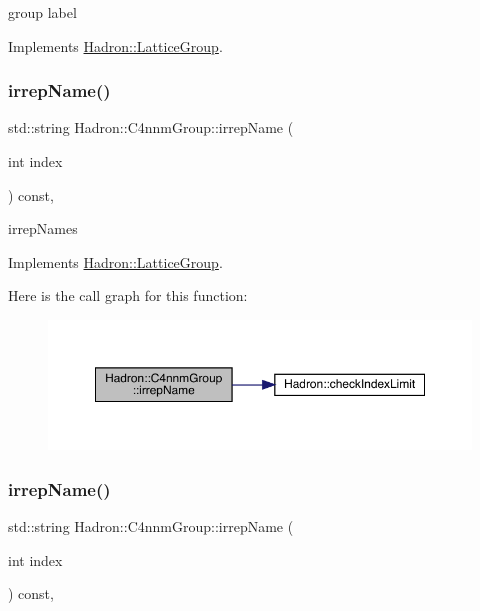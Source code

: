 group label 

Implements \mbox{\hyperlink{structHadron_1_1LatticeGroup_a82208a322bf1b1db489f16af38e70087}{Hadron\+::\+Lattice\+Group}}.

\mbox{\label{structHadron_1_1C4nnmGroup_ac2b3ee6989ddbd93bc63c46ac9626997}} 
\subsubsection{\texorpdfstring{irrepName()}{irrepName()}\hspace{0.1cm}{\footnotesize\ttfamily [1/2]}}
{\footnotesize\ttfamily std\+::string Hadron\+::\+C4nnm\+Group\+::irrep\+Name (\begin{DoxyParamCaption}\item[{int}]{index }\end{DoxyParamCaption}) const\hspace{0.3cm}{\ttfamily [inline]}, {\ttfamily [virtual]}}

irrep\+Names 

Implements \mbox{\hyperlink{structHadron_1_1LatticeGroup_a4bc5620218c2a73157e19bc4451fe746}{Hadron\+::\+Lattice\+Group}}.

Here is the call graph for this function\+:
\nopagebreak
\begin{figure}[H]
\begin{center}
\leavevmode
\includegraphics[width=350pt]{d1/dba/structHadron_1_1C4nnmGroup_ac2b3ee6989ddbd93bc63c46ac9626997_cgraph}
\end{center}
\end{figure}
\mbox{\label{structHadron_1_1C4nnmGroup_ac2b3ee6989ddbd93bc63c46ac9626997}} 
\subsubsection{\texorpdfstring{irrepName()}{irrepName()}\hspace{0.1cm}{\footnotesize\ttfamily [2/2]}}
{\footnotesize\ttfamily std\+::string Hadron\+::\+C4nnm\+Group\+::irrep\+Name (\begin{DoxyParamCaption}\item[{int}]{index }\end{DoxyParamCaption}) const\hspace{0.3cm}{\ttfamily [inline]}, {\ttfamily [virtual]}}

